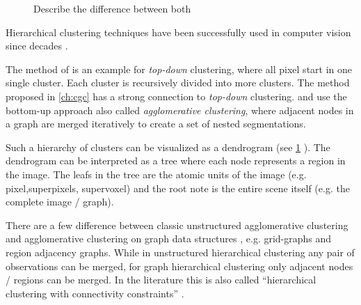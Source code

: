 \begin{figure}[H]
{{
        }
    }
    \caption[Bottom-up vs. top-down hierarchical clustering]{
        Describe the difference between both
    }
    \label{fig:hc_bottom_up_top_down}
\end{figure}


Hierarchical clustering techniques have been successfully used
in computer vision since decades \citep{ohlander_1978_cgip,forsyth_2002_book,arbelaez_2006_cvpr,iglesias_2013,morel_1995_book}.

The method  of \citet{ohlander_1978_cgip} is an example for \emph{top-down} clustering,
where all pixel start in one single cluster. Each cluster is recursively divided 
into  more clusters. The method proposed in \cref{ch:cgc} has a strong connection to
\emph{top-down} clustering.
\citet{arbelaez_2006_cvpr} and \citet{iglesias_2013} use the bottom-up approach 
also called \emph{agglomerative clustering}, where 
adjacent nodes in a graph are merged iteratively to create 
a set of nested segmentations.


Such a hierarchy of clusters can be visualized as a dendrogram (see \cref{fig:hc_bottom_up_top_down} ).
The dendrogram can be interpreted as a tree where each node represents a
region in the image.
The leafs in the tree are the atomic units of the image (e.g. pixel,superpixels, supervoxel)
and the root note is the entire scene itself (e.g. the complete image / graph).

There are a few difference between classic unstructured agglomerative clustering
\citep{florek_1951,sokal_1958_science_bulletin,ward_63_jasa}
and agglomerative clustering on graph data structures \citep{arbelaez_2006_cvpr,iglesias_2013,morel_1995_book}, 
e.g. grid-graphs and region adjacency graphs\citep{vlachos_1993_csv}.
While in unstructured hierarchical clustering any pair of observations can be merged,
for graph hierarchical clustering only adjacent nodes / regions can be merged.
In the literature this is also called ``hierarchical clustering with connectivity constraints'' \cite{scikit_learn}.


